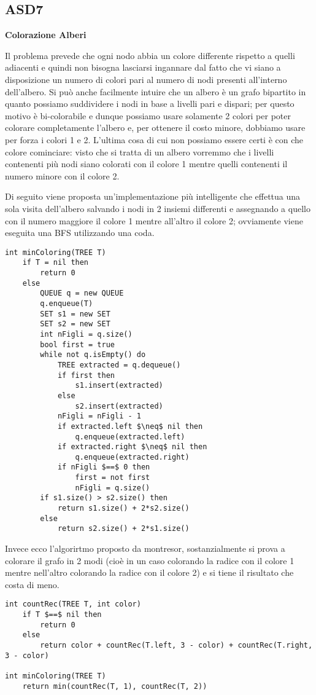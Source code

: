 \documentclass[../cheatSheetAlgoritmi.tex]{subfiles}
\begin{document}
\subsection{ASD7}
\textbf{Colorazione Alberi}

Il problema prevede che ogni nodo abbia un colore differente rispetto a quelli adiacenti e quindi non bisogna lasciarsi ingannare dal fatto che vi siano a disposizione un numero di colori pari al numero di nodi presenti all'interno dell'albero. Si può anche facilmente intuire che un albero è un grafo bipartito in quanto possiamo suddividere i nodi in base a livelli pari e dispari; per questo motivo è bi-colorabile e dunque possiamo usare solamente 2 colori per poter colorare completamente l'albero e, per ottenere il costo minore, dobbiamo usare per forza i colori 1 e 2. L'ultima cosa di cui non possiamo essere certi è con che colore cominciare: visto che si tratta di un albero vorremmo che i livelli contenenti più nodi siano colorati con il colore 1 mentre quelli contenenti il numero minore con il colore 2.

Di seguito viene proposta un'implementazione più intelligente che effettua una sola visita dell'albero salvando i nodi in 2 insiemi differenti e assegnando a quello con il numero maggiore il colore 1 mentre all'altro il colore 2; ovviamente viene eseguita una BFS utilizzando una coda.
\begin{lstlisting}[caption=Colorazione Alberi]
int minColoring(TREE T)
	if T = nil then
    	return 0
  	else
    	QUEUE q = new QUEUE
    	q.enqueue(T)
    	SET s1 = new SET
    	SET s2 = new SET
    	int nFigli = q.size()
    	bool first = true
    	while not q.isEmpty() do
      		TREE extracted = q.dequeue()
      		if first then
        		s1.insert(extracted)
      		else
        		s2.insert(extracted)
      		nFigli = nFigli - 1
      		if extracted.left $\neq$ nil then
        		q.enqueue(extracted.left)
      		if extracted.right $\neq$ nil then
       			q.enqueue(extracted.right)
      		if nFigli $==$ 0 then
        		first = not first
        		nFigli = q.size()
    	if s1.size() > s2.size() then
      		return s1.size() + 2*s2.size()
    	else
      		return s2.size() + 2*s1.size()
\end{lstlisting}
Invece ecco l'algorirtmo proposto da montresor, sostanzialmente si prova a colorare il grafo in 2 modi (cioè in un caso colorando la radice con il colore 1 mentre nell'altro colorando la radice con il colore 2) e si tiene il risultato che costa di meno.
\begin{lstlisting}[caption=Colorazione Alberi (by Montresor)]
int countRec(TREE T, int color)
	if T $==$ nil then
    	return 0
  	else
    	return color + countRec(T.left, 3 - color) + countRec(T.right, 3 - color)

int minColoring(TREE T)
	return min(countRec(T, 1), countRec(T, 2))
\end{lstlisting}

\newpage
\end{document}
